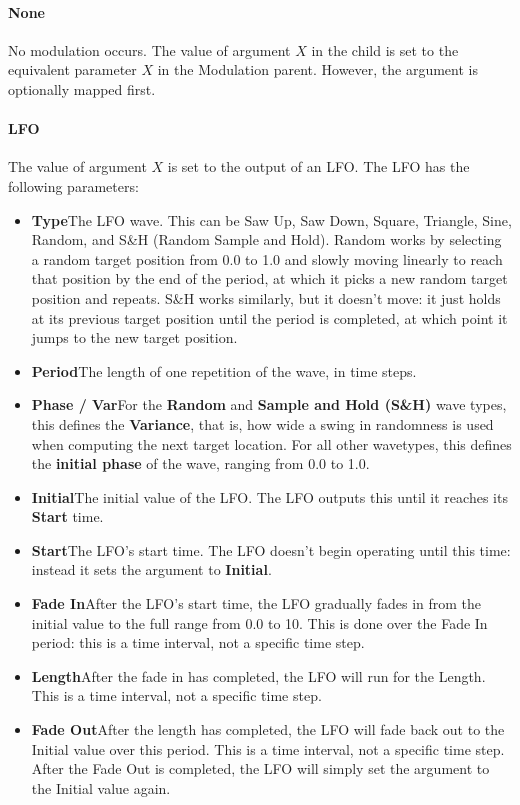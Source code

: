 \documentclass[twoside,10pt]{article}
\begin{document}
\paragraph{None}

No modulation occurs.  The value of argument \(X\) in the child is set to the equivalent parameter \(X\) in the Modulation parent.  However, the argument is optionally mapped first.

\paragraph{LFO}

The value of argument \(X\) is set to the output of an LFO.  The LFO has the following parameters:

\begin{itemize}
\item {\bf Type}\qquad The LFO wave.  This can be Saw Up, Saw Down, Square, Triangle, Sine, Random, and S\&H (Random Sample and Hold).  Random works by selecting a random target position from 0.0 to 1.0 and slowly moving linearly to reach that position by the end of the period, at which it picks a new random target position and repeats.  S\&H works similarly, but it doesn't move: it just holds at its previous target position until the period is completed, at which point it jumps to the new target position.
\item {\bf Period}\qquad The length of one repetition of the wave, in time steps.
\item {\bf Phase / Var}\qquad For the {\bf Random} and {\bf Sample and Hold (S\&H)} wave types, this defines the {\bf Variance}, that is, how wide a swing in randomness is used when computing the next target location.  For all other wavetypes, this defines the {\bf initial phase} of the wave, ranging from 0.0 to 1.0.
\item {\bf Initial}\qquad The initial value of the LFO.   The LFO outputs this until it reaches its {\bf Start} time.
\item {\bf Start}\qquad The LFO's start time.  The LFO doesn't begin operating until this time: instead it sets the argument to {\bf Initial}.
\item {\bf Fade In}\qquad After the LFO's start time, the LFO gradually fades in from the initial value to the full range from 0.0 to 10.  This is done over the Fade In period: this is a time interval, not a specific time step.
\item {\bf Length}\qquad After the fade in has completed, the LFO will run for the Length.  This is a time interval, not a specific time step.
\item {\bf Fade Out}\qquad After the length has completed, the LFO will fade back out to the Initial value over this period.  This is a time interval, not a specific time step.  After the Fade Out is completed, the LFO will simply set the argument to the Initial value again.
\end{itemize}
\end{document}
